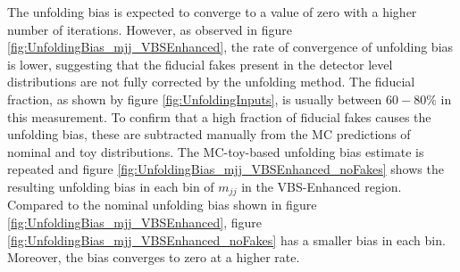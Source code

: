 The unfolding bias is expected to converge to a value of zero with a higher number of iterations. However, as observed in figure \ref{fig:UnfoldingBias_mjj_VBSEnhanced}, the rate of convergence of unfolding bias is lower, suggesting that the fiducial fakes present in the detector level distributions are not fully corrected by the unfolding method. The fiducial fraction, as shown by figure \ref{fig:UnfoldingInputs}, is usually between $60-80\%$ in this measurement. To confirm that a high fraction of fiducial fakes causes the unfolding bias, these are subtracted manually from the MC predictions of nominal and toy distributions. The MC-toy-based unfolding bias estimate is repeated and figure \ref{fig:UnfoldingBias_mjj_VBSEnhanced_noFakes} shows the resulting unfolding bias in each bin of $m_{jj}$ in the VBS-Enhanced region. Compared to the nominal unfolding bias shown in figure \ref{fig:UnfoldingBias_mjj_VBSEnhanced}, figure \ref{fig:UnfoldingBias_mjj_VBSEnhanced_noFakes} has a smaller bias in each bin. Moreover, the bias converges to zero at a higher rate.

